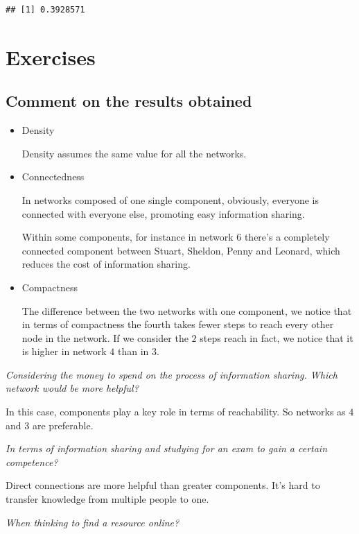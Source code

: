 \documentclass[
  notitlepage,
  onecolumn,
  openany]{book}
\begin{document}
\begin{verbatim}
## [1] 0.3928571
\end{verbatim}

\hypertarget{exercises}{%
\section{Exercises}\label{exercises}}

\hypertarget{comment-on-the-results-obtained}{%
\subsection{Comment on the results obtained}\label{comment-on-the-results-obtained}}

\begin{itemize}
\item
  Density

  Density assumes the same value for all the networks.
\item
  Connectedness

  In networks composed of one single component, obviously, everyone is connected with everyone else, promoting easy information sharing.

  Within some components, for instance in network \(6\) there's a completely connected component between Stuart, Sheldon, Penny and Leonard, which reduces the cost of information sharing.
\item
  Compactness

  The difference between the two networks with one component, we notice that in terms of compactness the fourth takes fewer steps to reach every other node in the network. If we consider the \(2\) steps reach in fact, we notice that it is higher in network \(4\) than in \(3\).
\end{itemize}

\emph{Considering the money to spend on the process of information sharing. Which network would be more helpful?}

In this case, components play a key role in terms of reachability. So networks as \(4\) and \(3\) are preferable.

\emph{In terms of information sharing and studying for an exam to gain a certain competence?}

Direct connections are more helpful than greater components. It's hard to transfer knowledge from multiple people to one.

\emph{When thinking to find a resource online?}
\end{document}
